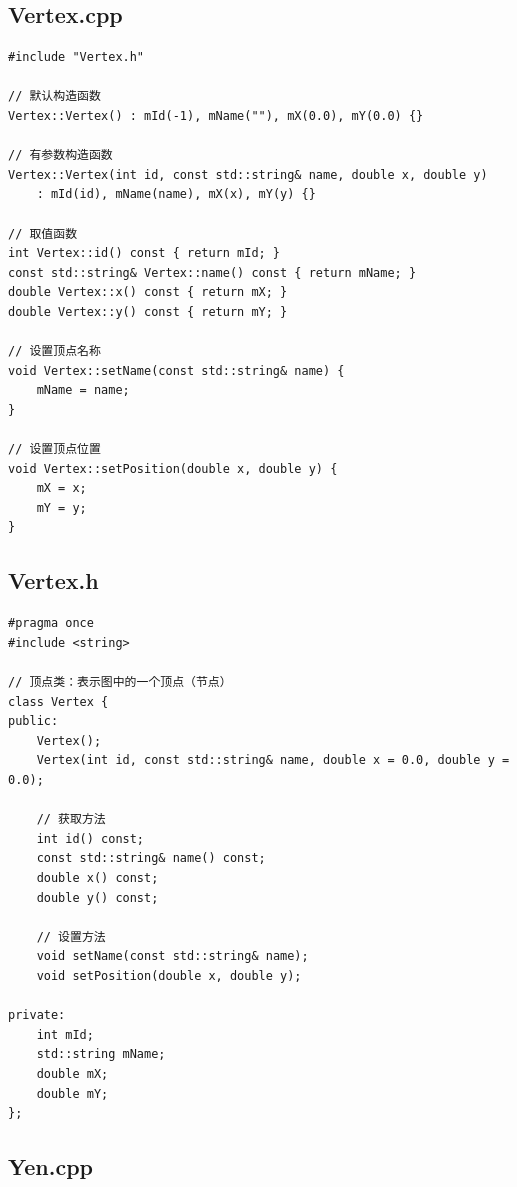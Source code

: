 \documentclass[UTF8,12pt,a4paper]{ctexart}
\begin{document}
\subsection{Vertex.cpp}

\begin{lstlisting}[caption={Vertex.cpp 源码}]
#include "Vertex.h"

// 默认构造函数
Vertex::Vertex() : mId(-1), mName(""), mX(0.0), mY(0.0) {}

// 有参数构造函数
Vertex::Vertex(int id, const std::string& name, double x, double y)
    : mId(id), mName(name), mX(x), mY(y) {}

// 取值函数
int Vertex::id() const { return mId; }
const std::string& Vertex::name() const { return mName; }
double Vertex::x() const { return mX; }
double Vertex::y() const { return mY; }

// 设置顶点名称
void Vertex::setName(const std::string& name) {
    mName = name;
}

// 设置顶点位置
void Vertex::setPosition(double x, double y) {
    mX = x;
    mY = y;
}

\end{lstlisting}

\subsection{Vertex.h}

\begin{lstlisting}[caption={Vertex.h 源码}]
#pragma once
#include <string>

// 顶点类：表示图中的一个顶点（节点）
class Vertex {
public:
    Vertex();
    Vertex(int id, const std::string& name, double x = 0.0, double y = 0.0);

    // 获取方法
    int id() const;
    const std::string& name() const;
    double x() const;
    double y() const;

    // 设置方法
    void setName(const std::string& name);
    void setPosition(double x, double y);

private:
    int mId;
    std::string mName;
    double mX;
    double mY;
};

\end{lstlisting}

\subsection{Yen.cpp}
\end{document}

